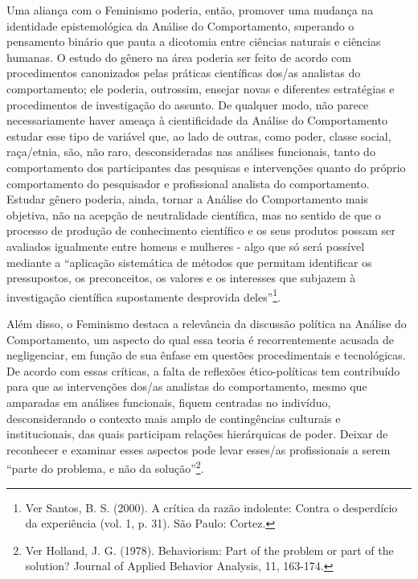 Uma aliança com o Feminismo poderia, então, promover uma mudança na identidade epistemológica da Análise do Comportamento, superando o pensamento binário que pauta a dicotomia entre ciências naturais e ciências humanas. O estudo do gênero na área poderia ser feito de acordo com procedimentos canonizados pelas práticas científicas dos/as analistas do comportamento; ele poderia, outrossim, ensejar novas e diferentes estratégias e procedimentos de investigação do assunto. De qualquer modo, não parece necessariamente haver ameaça à cientificidade da Análise do Comportamento estudar esse tipo de variável que, ao lado de outras, como poder, classe social, raça/etnia, são, não raro, desconsideradas nas análises funcionais, tanto do comportamento dos participantes das pesquisas e intervenções quanto do próprio comportamento do pesquisador e profissional analista do comportamento. Estudar gênero poderia, ainda, tornar a Análise do Comportamento mais objetiva, não na acepção de neutralidade científica, mas no sentido de que o processo de produção de conhecimento científico e os seus produtos possam ser avaliados igualmente entre homens e mulheres - algo que só será possível mediante a ``aplicação sistemática de métodos que permitam identificar os pressupostos, os preconceitos, os valores e os interesses que subjazem à investigação científica supostamente desprovida deles''\footnote{Ver Santos, B. S. (2000). A crítica da razão indolente: Contra o desperdício da experiência (vol. 1, p. 31). São Paulo: Cortez.}.

Além disso, o Feminismo destaca a relevância da discussão política na Análise do Comportamento, um aspecto do qual essa teoria é recorrentemente acusada de negligenciar, em função de sua ênfase em questões procedimentais e tecnológicas. De acordo com essas críticas, a falta de reflexões ético-políticas tem contribuído para que as intervenções dos/as analistas do comportamento, mesmo que amparadas em análises funcionais, fiquem centradas no indivíduo, desconsiderando o contexto mais amplo de contingências culturais e institucionais, das quais participam relações hierárquicas de poder. Deixar de reconhecer e examinar esses aspectos pode levar esses/as profissionais a serem “parte do problema, e não da solução”\footnote{Ver Holland, J. G. (1978). Behaviorism: Part of the problem or part of the solution? Journal of Applied Behavior Analysis, 11, 163-174.}.

